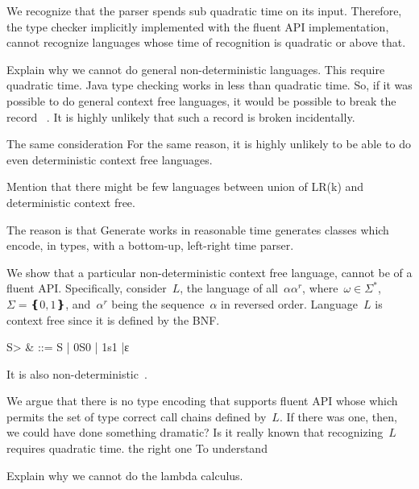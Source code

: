 We recognize that the \Java parser spends sub quadratic time
  on its input.
Therefore,
  the type checker implicitly implemented with the fluent API implementation,
  cannot recognize languages whose time of recognition is quadratic or above that.

Explain why we cannot do general non-deterministic languages. This require quadratic time.
Java type checking works in less than quadratic time. So, if it was possible to
do general context free languages, it would be possible to break the record
~\cite{cubic time algorithms}.
It is highly unlikely that such a record is broken incidentally.

The same consideration
For the same reason, it is highly unlikely to be able to do even deterministic context free languages.
~\cite{http://www.sciencedirect.com/science/article/pii/S0019995868910875}

   Mention that there might be few languages between union of LR(k) and deterministic context free.

The reason is that Generate works in reasonable time \Self generates classes which encode, in types, with a bottom-up, left-right time parser.

We show that a particular non-deterministic context free language,
cannot be of a fluent API.
Specifically, consider~$L$, the language of all~$αα^r$, where~$\omega∈Σ^*$,~$Σ=❴0,1❵$,
and~$α^r$ being the sequence~$α$ in reversed order.
Language~$L$ is context free since it is defined by the BNF.
\begin{Grammar}
  \begin{aligned}
    \<S> & ::= S | 0S0 | 1s1 |ε
  \end{aligned}
\end{Grammar}
It is also non-deterministic~\cite{Hopcroft:2001}.

We argue that there is no type encoding that supports fluent API whose
  which permits the set of type correct call chains defined by~$L$.
If there was one, then, we could have done something dramatic?
Is it really known that recognizing~$L$ requires quadratic
  time.
 the right one 
To understand


Explain why we cannot do the lambda calculus.
